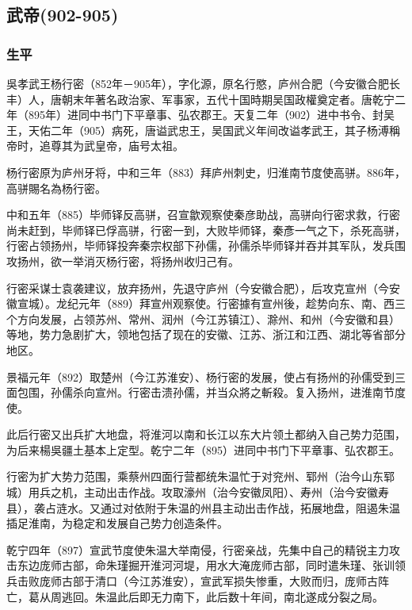 
\subsection{武帝\tiny(902-905)}

\subsubsection{生平}

吳孝武王杨行密（852年－905年），字化源，原名行愍，庐州合肥（今安徽合肥长丰）人，唐朝末年著名政治家、军事家，五代十国時期吴国政權奠定者。唐乾宁二年（895年）进同中书门下平章事、弘农郡王。天复二年（902）进中书令、封吴王，天佑二年（905）病死，唐谥武忠王，吴国武义年间改谥孝武王，其子杨溥稱帝时，追尊其为武皇帝，庙号太祖。

杨行密原为庐州牙将，中和三年（883）拜庐州刺史，归淮南节度使高骈。886年，高骈賜名為杨行密。

中和五年（885）毕师铎反高骈，召宣歙观察使秦彦助战，高骈向行密求救，行密尚未赶到，毕师铎已俘高骈，行密一到，大败毕师铎，秦彥一气之下，杀死高骈，行密占领扬州，毕师铎投奔秦宗权部下孙儒，孙儒杀毕师铎并吞并其军队，发兵围攻扬州，欲一举消灭杨行密，将扬州收归己有。

行密采谋士袁袭建议，放弃扬州，先退守庐州（今安徽合肥），后攻克宣州（今安徽宣城）。龙纪元年（889）拜宣州观察使。行密據有宣州後，趁势向东、南、西三个方向发展，占领苏州、常州、润州（今江苏镇江）、滁州、和州（今安徽和县）等地，势力急剧扩大，领地包括了现在的安徽、江苏、浙江和江西、湖北等省部分地区。

景福元年（892）取楚州（今江苏淮安）、杨行密的发展，使占有扬州的孙儒受到三面包围，孙儒杀向宣州。行密击溃孙儒，并当众將之斬殺。复入扬州，进淮南节度使。

此后行密又出兵扩大地盘，将淮河以南和长江以东大片领土都纳入自己势力范围，为后来楊吳疆土基本上定型。乾宁二年（895）进同中书门下平章事、弘农郡王。

行密为扩大势力范围，乘蔡州四面行营都统朱温忙于对兖州、郓州（治今山东郓城）用兵之机，主动出击作战。攻取濠州（治今安徽凤阳）、寿州（治今安徽寿县），袭占涟水。又通过对依附于朱温的州县主动出击作战，拓展地盘，阻遏朱温插足淮南，为稳定和发展自己势力创造条件。

乾宁四年（897）宣武节度使朱温大举南侵，行密亲战，先集中自己的精锐主力攻击东边庞师古部，命朱瑾掘开淮河河堤，用水大淹庞师古部，同时遣朱瑾、张训领兵击败庞师古部于清口（今江苏淮安），宣武军损失惨重，大败而归，庞师古阵亡，葛从周逃回。朱温此后即无力南下，此后数十年间，南北遂成分裂之局。


